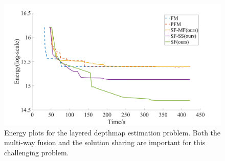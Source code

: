 \begin{figure}[!h]
  \centering
  \includegraphics[width=0.8\columnwidth]{figure/layered_depthmap_convergence.png}
  \caption{Energy plots for the layered depthmap estimation
 problem. Both the multi-way fusion and the solution sharing are important
 for this challenging problem.}\label{fig:layered_depthmap_convergence}
\end{figure}

